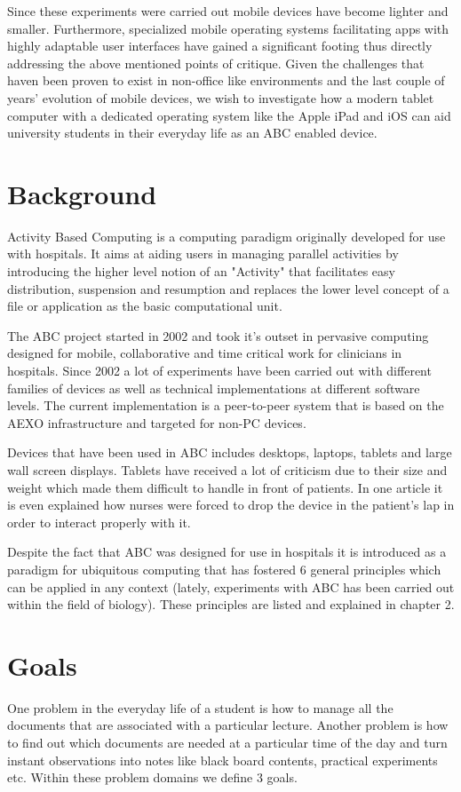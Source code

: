 Since these experiments were carried out mobile devices have become lighter and smaller. Furthermore, specialized mobile operating systems facilitating apps with highly adaptable user interfaces have gained a significant footing thus directly addressing the above mentioned points of critique. Given the challenges that haven been proven to exist in non-office like environments \citep{bardram2011} and the last couple of years' evolution of mobile devices, we wish to investigate how a modern tablet computer with a dedicated operating system like the Apple iPad and iOS can aid university students in their everyday life as an ABC enabled device.

\section{Background}
Activity Based Computing is a computing paradigm originally developed for use with hospitals. It aims at aiding users in managing parallel activities by introducing the higher level notion of an "Activity" that facilitates easy distribution, suspension and resumption and replaces the lower level concept of a file or application as the basic computational unit.

The ABC project started in 2002 and took it's outset in pervasive computing designed for mobile, collaborative and time critical work for clinicians in hospitals. Since 2002 a lot of experiments have been carried out with different families of devices as well as technical implementations at different software levels. The current implementation is a peer-to-peer system that is based on the AEXO infrastructure and targeted for non-PC devices.

Devices that have been used in ABC includes desktops, laptops, tablets and large wall screen displays. Tablets have received a lot of criticism due to their size and weight which made them difficult to handle in front of patients. In one article \citep{bardram2009} it is even explained how nurses were forced to drop the device in the patient's lap in order to interact properly with it.

Despite the fact that ABC was designed for use in hospitals it is introduced as a paradigm for ubiquitous computing that has fostered 6 general principles which can be applied in any context (lately, experiments with ABC has been carried out within the field of biology). These principles are listed and explained in chapter 2.

\section{Goals}
One problem in the everyday life of a student is how to manage all the documents that are associated with a particular lecture. Another problem is how to find out which documents are needed at a particular time of the day and turn instant observations into notes like black board contents, practical experiments etc. Within these problem domains we define 3 goals.

